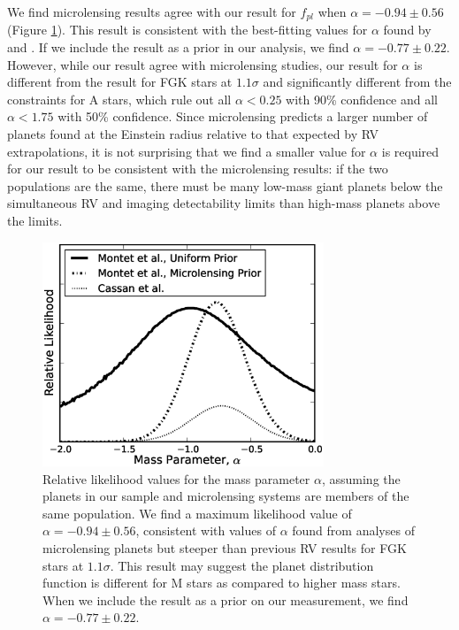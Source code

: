 We find microlensing results agree with our result for $f_{pl}$ when $\alpha = -0.94 \pm 0.56$ (Figure \ref{alphaopik}). This result is consistent with the best-fitting values for $\alpha$ found by \citet{Gould10} and \citet{Cassan12}. If we include the \citet{Cassan12} result as a prior in our analysis, we find $\alpha = -0.77 \pm 0.22$. However, while our result agree with microlensing studies, our result for $\alpha$ is different from the \citet{Cumming08} result for FGK stars at $1.1 \sigma$ and significantly different from the \citet{Bowler10} constraints for A stars, which rule out all $\alpha < 0.25$ with 90\% confidence and all $\alpha < 1.75$ with 50\% confidence. Since microlensing predicts a larger number of planets found at the Einstein radius relative to that expected by RV extrapolations, it is not surprising that we find a smaller value for $\alpha$ is required for our result to be consistent with the microlensing results: if the two populations are the same, there must be many low-mass giant planets below the simultaneous RV and imaging detectability limits than high-mass planets above the limits.

\begin{figure}[htbp]
\centerline{\includegraphics[width=0.75\textwidth]{chapter3/f14.eps}}
\caption[Relative likelihood values for the mass parameter $\alpha$, assuming the planets in our sample and microlensing systems are members of the same population]{Relative likelihood values for the mass parameter $\alpha$, assuming the planets in our sample and microlensing systems are members of the same population. We find a maximum likelihood value of $\alpha = -0.94 \pm 0.56$, consistent with values of $\alpha$ found from analyses of microlensing planets but steeper than previous RV results for FGK stars at $1.1 \sigma$. This result may suggest the planet distribution function is different for M stars as compared to higher mass stars. When we include the \citet{Cassan12} result as a prior on our measurement, we find $\alpha=-0.77 \pm 0.22$.
  }
\label{alphaopik}
\end{figure}

